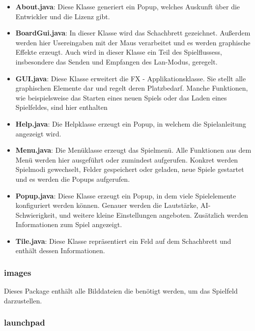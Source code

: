 \documentclass[12pt,a4paper]{article}
\begin{document}
{\begin{itemize}

	\item{\textbf{About.java}: Diese Klasse generiert ein Popup, welches Auskunft über die Entwickler und die Lizenz gibt. }
	
	\item{\textbf{BoardGui.java}: In dieser Klasse wird das Schachbrett gezeichnet. Außerdem werden hier Usereingaben mit der Maus verarbeitet und es werden graphische Effekte erzeugt. Auch wird in dieser Klasse ein Teil des Spielflussess, insbesondere das Senden und Empfangen des Lan-Modus, geregelt. }
	
	\item{\textbf{GUI.java}: Diese Klasse erweitert die FX - Applikationsklasse. Sie stellt alle graphischen Elemente dar und regelt deren Platzbedarf. Manche Funktionen, wie beispielsweise das Starten eines neuen Spiels oder das Laden eines Spielfeldes, sind hier enthalten }
	
	\item{\textbf{Help.java}: Die Helpklasse erzeugt ein Popup, in welchem die Spielanleitung angezeigt wird.}
	
	\item{\textbf{Menu.java}: Die Menüklasse erzeugt das Spielmenü. Alle Funktionen aus dem Menü werden hier ausgeführt oder zumindest aufgerufen. Konkret werden Spielmodi gewechselt, Felder gespeichert oder geladen, neue Spiele gestartet und es werden die Popups aufgerufen.}
	
	\item{\textbf{Popup.java}: Diese Klasse erzeugt ein Popup, in dem viele Spielelemente konfiguriert werden können. Genauer werden die Lautstärke, AI-Schwierigkeit, und weitere kleine Einstellungen angeboten. Zusätzlich werden Informationen zum Spiel angezeigt. }
	
	\item{\textbf{Tile.java}: Diese Klasse repräsentiert ein Feld auf dem Schachbrett und enthält dessen Informationen.}

\end{itemize}

\subsubsection{images}

Dieses Package enthält alle Bilddateien die benötigt werden, um das Spielfeld darzustellen. 

\subsubsection{launchpad}

}
\end{document}
